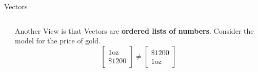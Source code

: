 \documentclass[10pt, aspectratio=169]{beamer}
\begin{document}
\begin{frame}{Vectors}
\begin{columns}
\begin{column}{0.6\textwidth}
    \end{column}
    
    \begin{column}{0.4\textwidth}
        Another View is that Vectors are \textbf{ordered lists of numbers}.
        Consider the model for the price of gold.
        \[
        \begin{bmatrix}
            1\text{oz}\\
            \$ 1200
        \end{bmatrix}
        \neq 
        \begin{bmatrix}
            \$1200\\
            1\text{oz}
        \end{bmatrix}
        \]
    \end{column}
\end{columns}
\end{frame}
\end{document}
